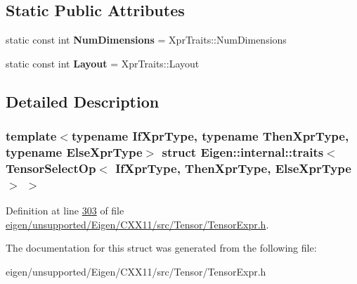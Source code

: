 \subsection*{Static Public Attributes}
\begin{DoxyCompactItemize}
\item 
\mbox{\label{struct_eigen_1_1internal_1_1traits_3_01_tensor_select_op_3_01_if_xpr_type_00_01_then_xpr_type_00_01_else_xpr_type_01_4_01_4_a5c224fee39cf514b6a2004da09a0d78c}} 
static const int {\bfseries Num\+Dimensions} = Xpr\+Traits\+::\+Num\+Dimensions
\item 
\mbox{\label{struct_eigen_1_1internal_1_1traits_3_01_tensor_select_op_3_01_if_xpr_type_00_01_then_xpr_type_00_01_else_xpr_type_01_4_01_4_ab4dc8cf153d97d4e83da3307d6ce061e}} 
static const int {\bfseries Layout} = Xpr\+Traits\+::\+Layout
\end{DoxyCompactItemize}


\subsection{Detailed Description}
\subsubsection*{template$<$typename If\+Xpr\+Type, typename Then\+Xpr\+Type, typename Else\+Xpr\+Type$>$\newline
struct Eigen\+::internal\+::traits$<$ Tensor\+Select\+Op$<$ If\+Xpr\+Type, Then\+Xpr\+Type, Else\+Xpr\+Type $>$ $>$}



Definition at line \hyperlink{eigen_2unsupported_2_eigen_2_c_x_x11_2src_2_tensor_2_tensor_expr_8h_source_l00303}{303} of file \hyperlink{eigen_2unsupported_2_eigen_2_c_x_x11_2src_2_tensor_2_tensor_expr_8h_source}{eigen/unsupported/\+Eigen/\+C\+X\+X11/src/\+Tensor/\+Tensor\+Expr.\+h}.



The documentation for this struct was generated from the following file\+:\begin{DoxyCompactItemize}
\item 
eigen/unsupported/\+Eigen/\+C\+X\+X11/src/\+Tensor/\+Tensor\+Expr.\+h\end{DoxyCompactItemize}
